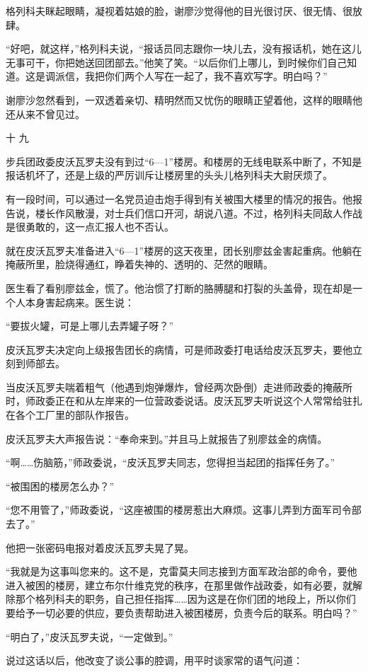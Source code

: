 格列科夫眯起眼睛，凝视着姑娘的脸，谢廖沙觉得他的目光很讨厌、很无情、很放肆。

“好吧，就这样，”格列科夫说，“报话员同志跟你一块儿去，没有报话机，她在这儿无事可干，你把她送回团部去。”他笑了笑。“以后你们上哪儿，到时候你们自己知道。这是调派信，我把你们两个人写在一起了，我不喜欢写字。明白吗？”

谢廖沙忽然看到，一双透着亲切、精明然而又忧伤的眼睛正望着他，这样的眼睛他还从来不曾见过。

十 九

步兵团政委皮沃瓦罗夫没有到过“6—1”楼房。和楼房的无线电联系中断了，不知是报话机坏了，还是上级的严厉训斥让楼房里的头头儿格列科夫大尉厌烦了。

有一段时间，可以通过一名党员迫击炮手得到有关被围大楼里的情况的报告。他报告说，楼长作风散漫，对士兵们信口开河，胡说八道。不过，格列科夫同敌人作战是很勇敢的，这一点汇报人也不否认。

就在皮沃瓦罗夫准备进入“6—1”楼房的这天夜里，团长别廖兹金害起重病。他躺在掩蔽所里，脸烧得通红，睁着失神的、透明的、茫然的眼睛。

医生看了看别廖兹金，慌了。他治惯了打断的胳膊腿和打裂的头盖骨，现在却是一个人本身害起病来。医生说：

“要拔火罐，可是上哪儿去弄罐子呀？”

皮沃瓦罗夫决定向上级报吿团长的病情，可是师政委打电话给皮沃瓦罗夫，要他立刻到师部去。

当皮沃瓦罗夫喘着粗气（他遇到炮弹爆炸，曾经两次卧倒）走进师政委的掩蔽所时，师政委正在和从左岸来的一位营政委说话。皮沃瓦罗夫听说这个人常常给驻扎在各个工厂里的部队作报告。

皮沃瓦罗夫大声报告说：“奉命来到。”并且马上就报告了别廖兹金的病情。

“啊……伤脑筋，”师政委说，“皮沃瓦罗夫同志，您得担当起团的指挥任务了。”

“被围困的楼房怎么办？”

“您不用管了，”师政委说，“这座被围的楼房惹出大麻烦。这事儿弄到方面军司令部去了。”

他把一张密码电报对着皮沃瓦罗夫晃了晃。

“我就是为这事叫您来的。这不是，克雷莫夫同志接到方面军政治部的命令，要他进入被困的楼房，建立布尔什维克党的秩序，在那里做作战政委，如有必要，就解除那个格列科夫的职务，自己担任指挥……因为这是在你们团的地段上，所以你们要给予一切必要的供应，要负责帮助进入被困楼房，负责今后的联系。明白吗？”

“明白了，”皮沃瓦罗夫说，“一定做到。”

说过这话以后，他改变了谈公事的腔调，用平时谈家常的语气问道：


